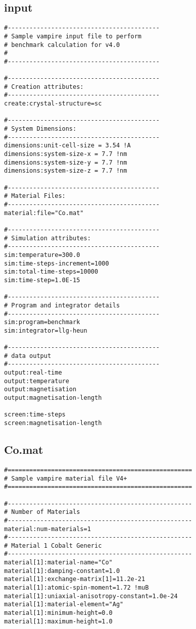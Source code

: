 \subsection*{input}
{\footnotesize
\begin{verbatim}
#------------------------------------------
# Sample vampire input file to perform
# benchmark calculation for v4.0
#
#------------------------------------------

#------------------------------------------
# Creation attributes:
#------------------------------------------
create:crystal-structure=sc

#------------------------------------------
# System Dimensions:
#------------------------------------------
dimensions:unit-cell-size = 3.54 !A
dimensions:system-size-x = 7.7 !nm
dimensions:system-size-y = 7.7 !nm
dimensions:system-size-z = 7.7 !nm

#------------------------------------------
# Material Files:
#------------------------------------------
material:file="Co.mat"

#------------------------------------------
# Simulation attributes:
#------------------------------------------
sim:temperature=300.0
sim:time-steps-increment=1000
sim:total-time-steps=10000
sim:time-step=1.0E-15

#------------------------------------------
# Program and integrator details
#------------------------------------------
sim:program=benchmark
sim:integrator=llg-heun

#------------------------------------------
# data output
#------------------------------------------
output:real-time
output:temperature
output:magnetisation
output:magnetisation-length

screen:time-steps
screen:magnetisation-length
\end{verbatim}
}
\subsection*{Co.mat}
{\footnotesize
\begin{verbatim}
#===================================================
# Sample vampire material file V4+
#===================================================

#---------------------------------------------------
# Number of Materials
#---------------------------------------------------
material:num-materials=1
#---------------------------------------------------
# Material 1 Cobalt Generic
#---------------------------------------------------
material[1]:material-name="Co"
material[1]:damping-constant=1.0
material[1]:exchange-matrix[1]=11.2e-21
material[1]:atomic-spin-moment=1.72 !muB
material[1]:uniaxial-anisotropy-constant=1.0e-24
material[1]:material-element="Ag"
material[1]:minimum-height=0.0
material[1]:maximum-height=1.0
\end{verbatim}
}


